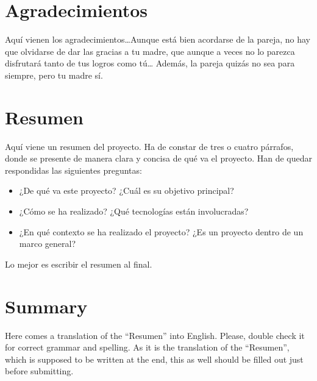 \documentclass[a4paper, 12pt]{book}
\begin{document}
\chapter*{Agradecimientos}

Aquí vienen los agradecimientos\ldots Aunque está bien acordarse de la pareja, no hay que olvidarse de dar las gracias a tu madre, que aunque a veces no lo parezca disfrutará tanto de tus logros como tú\ldots 
Además, la pareja quizás no sea para siempre, pero tu madre sí.


\chapter*{Resumen}

Aquí viene un resumen del proyecto.
Ha de constar de tres o cuatro párrafos, donde se presente de manera clara y concisa de qué va el proyecto. 
Han de quedar respondidas las siguientes preguntas:

\begin{itemize}
  \item ¿De qué va este proyecto? ¿Cuál es su objetivo principal?
  \item ¿Cómo se ha realizado? ¿Qué tecnologías están involucradas?
  \item ¿En qué contexto se ha realizado el proyecto? ¿Es un proyecto dentro de un marco general?
\end{itemize}

Lo mejor es escribir el resumen al final.


\chapter*{Summary}

Here comes a translation of the ``Resumen'' into English. 
Please, double check it for correct grammar and spelling.
As it is the translation of the ``Resumen'', which is supposed to be written at the end, this as well should be filled out just before submitting.
\end{document}
